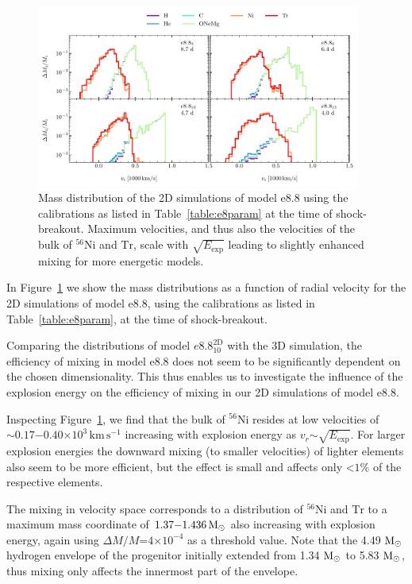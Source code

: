 \documentclass[fleqn,usenatbib]{mnras}
\newcommand{\nickel}{\ensuremath{\mathrm{^{56}Ni}}\xspace}
\newcommand{\tracer}{\ensuremath{\mathrm{Tr}}\xspace}
\newcommand{\solm}{\ensuremath{\rm{M_{\odot}}}\xspace}
\newcommand{\kms}{\ensuremath{\mathrm{km\, s^{-1}}}}
\newcommand{\onemg}{\ensuremath{\mathrm{e8.8}}\xspace}
\begin{document}
\begin{figure}%
 \centering
 \includegraphics[width=0.95\textwidth]{pic/e8_2d_all_sbo_massdis_velocity.pdf}
 \caption{Mass distribution of the 2D simulations of model \onemg using the calibrations as listed in Table~\ref{table:e8param} at the time of shock-breakout. Maximum velocities, and thus also the velocities of the bulk of \nickel and \tracer, scale with $\sqrt{E_{\mathrm{exp}}}$ leading to slightly enhanced mixing for more energetic models. }
 \label{fig:e8 2d massDis sbo}
\end{figure}
In Figure~\ref{fig:e8 2d massDis sbo} we show the mass distributions as a function of radial velocity for the 2D simulations of model \onemg, using the calibrations as listed in Table~\ref{table:e8param}, at the time of shock-breakout. 

Comparing the distributions of model $e8.8_{10}^{\mathrm{2D}}$ with the 3D simulation, the efficiency of mixing in model \onemg does not seem to be significantly dependent on the chosen dimensionality. This thus enables us to investigate the influence of the explosion energy on the efficiency of mixing in our 2D simulations of model \onemg.
 
Inspecting Figure~\ref{fig:e8 2d massDis sbo}, we find that the bulk of \nickel resides at low velocities of $\mathord{\sim}0.17\mathord{-}0.40\mathord{\times}10^3\,\kms$ increasing with explosion energy as $v_{r}\mathord{\sim}\sqrt{E_{\mathrm{exp}}}$. 
For larger explosion energies the downward mixing (to smaller velocities) of lighter elements also seem to be more efficient, but the effect is small and affects only $\mathord{<}1\%$ of the respective elements. 

The mixing in velocity space corresponds to a distribution of \nickel and \tracer to a maximum mass coordinate of $1.37\mathord{-}1.436\,\solm$ also increasing with explosion energy, again using $\Delta M/M\mathord{=}4\mathord{\times}10^{-4}$ as a threshold value. Note that the 4.49 \solm hydrogen envelope of the progenitor initially extended from 1.34 \solm to 5.83 \solm, thus mixing only affects the innermost part of the envelope.
\end{document}

